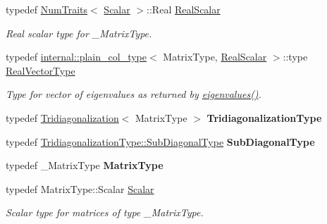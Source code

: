 \begin{DoxyCompactItemize}
\item 
typedef \hyperlink{group___core___module_struct_eigen_1_1_num_traits}{Num\+Traits}$<$ \hyperlink{group___eigenvalues___module_a0bfcedf4245b6846007ca4f01e4feb1f}{Scalar} $>$\+::Real \hyperlink{group___eigenvalues___module_a5dae5f422a3c71060e6bd31332bf64fd}{Real\+Scalar}
\begin{DoxyCompactList}\small\item\em Real scalar type for {\ttfamily \+\_\+\+Matrix\+Type}. \end{DoxyCompactList}\item 
typedef \hyperlink{struct_eigen_1_1internal_1_1plain__col__type}{internal\+::plain\+\_\+col\+\_\+type}$<$ Matrix\+Type, \hyperlink{group___eigenvalues___module_a5dae5f422a3c71060e6bd31332bf64fd}{Real\+Scalar} $>$\+::type \hyperlink{group___eigenvalues___module_acd090d5fdfc3cc017a13b6d8daa92287}{Real\+Vector\+Type}
\begin{DoxyCompactList}\small\item\em Type for vector of eigenvalues as returned by \hyperlink{group___eigenvalues___module_a8efab27e82aa6aa0ae0c64739238c2e0}{eigenvalues()}. \end{DoxyCompactList}\item 
\mbox{\label{group___eigenvalues___module_aee7b34cdccc189fa836c20f55f8415dd}} 
typedef \hyperlink{group___eigenvalues___module_class_eigen_1_1_tridiagonalization}{Tridiagonalization}$<$ Matrix\+Type $>$ {\bfseries Tridiagonalization\+Type}
\item 
\mbox{\label{group___eigenvalues___module_aeef7348fa4e1c14b469fd26d17f7713e}} 
typedef \hyperlink{group___core___module_class_eigen_1_1_matrix}{Tridiagonalization\+Type\+::\+Sub\+Diagonal\+Type} {\bfseries Sub\+Diagonal\+Type}
\item 
\mbox{\label{group___eigenvalues___module_aa8238634587d40c56228848470acb4ef}} 
typedef \+\_\+\+Matrix\+Type {\bfseries Matrix\+Type}
\item 
\mbox{\label{group___eigenvalues___module_a0bfcedf4245b6846007ca4f01e4feb1f}} 
typedef Matrix\+Type\+::\+Scalar \hyperlink{group___eigenvalues___module_a0bfcedf4245b6846007ca4f01e4feb1f}{Scalar}
\begin{DoxyCompactList}\small\item\em Scalar type for matrices of type {\ttfamily \+\_\+\+Matrix\+Type}. \end{DoxyCompactList}\item 

\end{DoxyCompactItemize}
